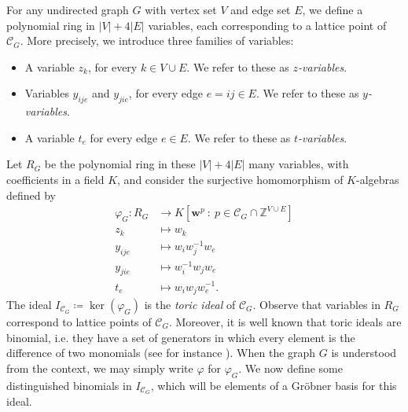\documentclass[11pt]{article}
\theoremstyle{definition}
\numberwithin{equation}{section}
\begin{document}
For any undirected graph $G$ with vertex set $V$ and edge set $E$, we define a polynomial ring in $|V|+4|E|$ variables, each corresponding to a lattice point of $\mathcal{C}_G$. More precisely, we introduce three families of variables:
\begin{itemize}
    \item[-] A variable $z_k$, for every $k\in V\cup E$. We refer to these as \emph{$z$-variables}.
    \item[-] Variables $y_{ije}$ and $y_{jie}$, for every edge $e=ij\in E$. We refer to these as \emph{$y$-variables}. 
    \item[-] A variable $t_e$ for every edge $e\in E$. We refer to these as \emph{$t$-variables}. 
\end{itemize}
Let $R_G$ be the polynomial ring in these $|V|+4|E|$ many variables, with coefficients in a field $K$, and consider the surjective homomorphism of $K$-algebras defined by
\begin{align*}
    \varphi_G: R_G&\to K[\mathbf{w}^{p} ~ : ~ p\in \mathcal{C}_G\cap \mathbb{Z}^{V\cup E}]\\
    z_k &\mapsto w_k\\
    y_{ije} &\mapsto w_iw_j^{-1}w_{e}\\
    y_{jie} &\mapsto w_i^{-1}w_j w_{e} \\ 
    t_{e} &\mapsto w_iw_jw_{e}^{-1}.
\end{align*}
The ideal $I_{\mathcal{C}_G}\coloneqq \ker(\varphi_G)$ is the \emph{toric ideal} of $\mathcal{C}_G$. Observe that variables in $R_G$ correspond to lattice points of $\mathcal{C}_G$. Moreover, it is well known that toric ideals are binomial, i.e. they have a set of generators in which every element is the difference of two monomials (see for instance \cite[Theorem 3.2]{binomial}). 
When the graph $G$ is understood from the context, we may simply write $\varphi$ for $\varphi_G$.
We now define some distinguished binomials in $I_{\mathcal{C}_G}$, which will be elements of a Gr\"{o}bner basis for this ideal.
\end{document}
